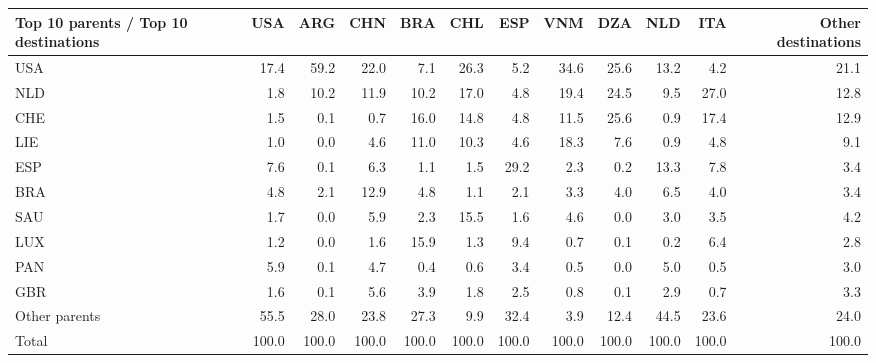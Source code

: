 \begin{tabular}{lrrrrrrrrrrr}
\toprule
Top 10 parents / Top 10 destinations & USA & ARG & CHN & BRA & CHL & ESP & VNM & DZA & NLD & ITA & Other destinations \\
\midrule
USA & 17.4 & 59.2 & 22.0 & 7.1 & 26.3 & 5.2 & 34.6 & 25.6 & 13.2 & 4.2 & 21.1 \\
NLD & 1.8 & 10.2 & 11.9 & 10.2 & 17.0 & 4.8 & 19.4 & 24.5 & 9.5 & 27.0 & 12.8 \\
CHE & 1.5 & 0.1 & 0.7 & 16.0 & 14.8 & 4.8 & 11.5 & 25.6 & 0.9 & 17.4 & 12.9 \\
LIE & 1.0 & 0.0 & 4.6 & 11.0 & 10.3 & 4.6 & 18.3 & 7.6 & 0.9 & 4.8 & 9.1 \\
ESP & 7.6 & 0.1 & 6.3 & 1.1 & 1.5 & 29.2 & 2.3 & 0.2 & 13.3 & 7.8 & 3.4 \\
BRA & 4.8 & 2.1 & 12.9 & 4.8 & 1.1 & 2.1 & 3.3 & 4.0 & 6.5 & 4.0 & 3.4 \\
SAU & 1.7 & 0.0 & 5.9 & 2.3 & 15.5 & 1.6 & 4.6 & 0.0 & 3.0 & 3.5 & 4.2 \\
LUX & 1.2 & 0.0 & 1.6 & 15.9 & 1.3 & 9.4 & 0.7 & 0.1 & 0.2 & 6.4 & 2.8 \\
PAN & 5.9 & 0.1 & 4.7 & 0.4 & 0.6 & 3.4 & 0.5 & 0.0 & 5.0 & 0.5 & 3.0 \\
GBR & 1.6 & 0.1 & 5.6 & 3.9 & 1.8 & 2.5 & 0.8 & 0.1 & 2.9 & 0.7 & 3.3 \\
Other parents & 55.5 & 28.0 & 23.8 & 27.3 & 9.9 & 32.4 & 3.9 & 12.4 & 44.5 & 23.6 & 24.0 \\
\midrule
Total & 100.0 & 100.0 & 100.0 & 100.0 & 100.0 & 100.0 & 100.0 & 100.0 & 100.0 & 100.0 & 100.0 \\
\bottomrule
\end{tabular}

